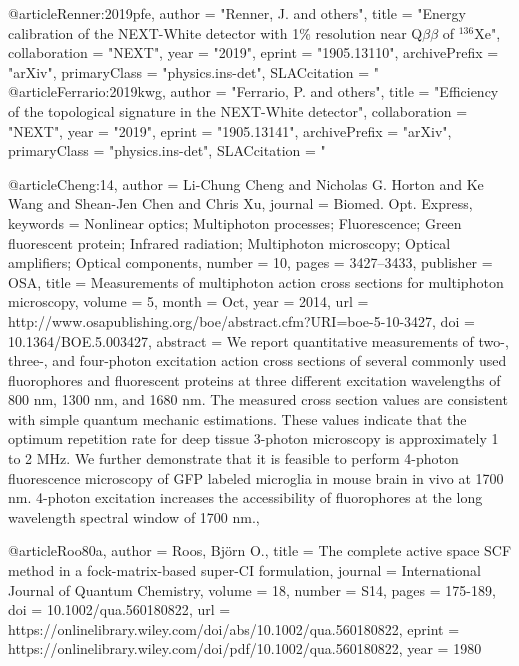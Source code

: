@article{Renner:2019pfe,
      author         = "Renner, J. and others",
      title          = "{Energy calibration of the NEXT-White detector with 1\%
                        resolution near Q$\beta\beta$ of $^{136}$Xe}",
      collaboration  = "NEXT",
      year           = "2019",
      eprint         = "1905.13110",
      archivePrefix  = "arXiv",
      primaryClass   = "physics.ins-det",
      SLACcitation   = "%
}
@article{Ferrario:2019kwg,
      author         = "Ferrario, P. and others",
      title          = "{Efficiency of the topological signature in the
                        NEXT-White detector}",
      collaboration  = "NEXT",
      year           = "2019",
      eprint         = "1905.13141",
      archivePrefix  = "arXiv",
      primaryClass   = "physics.ins-det",
      SLACcitation   = "%
}

@article{Cheng:14,
author = {Li-Chung Cheng and Nicholas G. Horton and Ke Wang and Shean-Jen Chen and Chris Xu},
journal = {Biomed. Opt. Express},
keywords = {Nonlinear optics; Multiphoton processes; Fluorescence; Green fluorescent protein; Infrared radiation; Multiphoton microscopy; Optical amplifiers; Optical components},
number = {10},
pages = {3427--3433},
publisher = {OSA},
title = {Measurements of multiphoton action cross sections for multiphoton microscopy},
volume = {5},
month = {Oct},
year = {2014},
url = {http://www.osapublishing.org/boe/abstract.cfm?URI=boe-5-10-3427},
doi = {10.1364/BOE.5.003427},
abstract = {We report quantitative measurements of two-, three-, and four-photon excitation action cross sections of several commonly used fluorophores and fluorescent proteins at three different excitation wavelengths of 800 nm, 1300 nm, and 1680 nm. The measured cross section values are consistent with simple quantum mechanic estimations. These values indicate that the optimum repetition rate for deep tissue 3-photon microscopy is approximately 1 to 2 MHz. We further demonstrate that it is feasible to perform 4-photon fluorescence microscopy of GFP labeled microglia in mouse brain in vivo at 1700 nm. 4-photon excitation increases the accessibility of fluorophores at the long wavelength spectral window of 1700 nm.},
}

@article{Roo80a,
author = {Roos, Björn O.},
title = {The complete active space SCF method in a fock-matrix-based super-CI formulation},
journal = {International Journal of Quantum Chemistry},
volume = {18},
number = {S14},
pages = {175-189},
doi = {10.1002/qua.560180822},
url = {https://onlinelibrary.wiley.com/doi/abs/10.1002/qua.560180822},
eprint = {https://onlinelibrary.wiley.com/doi/pdf/10.1002/qua.560180822},
year = {1980}
}

